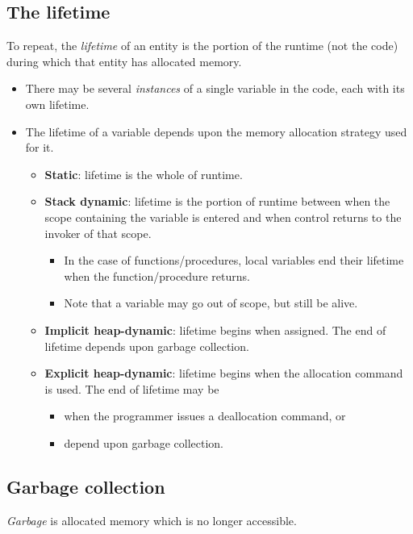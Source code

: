 \documentclass[11pt]{article}
\theoremstyle{definition}
\begin{document}
\subsection{The lifetime}
\label{sec:org3779266}
To repeat,
the \emph{lifetime} of an entity is the portion of the runtime
(not the code) during which that entity has allocated memory.
\begin{itemize}
\item There may be several \emph{instances} of a single variable in the code,
each with its own lifetime.
\item The lifetime of a variable depends upon the memory allocation
strategy used for it.
\begin{itemize}
\item \textbf{Static}: lifetime is the whole of runtime.
\item \textbf{Stack dynamic}: lifetime is the portion of runtime between
when the scope containing the variable is entered
and when control returns to the invoker of that scope.
\begin{itemize}
\item In the case of functions/procedures, local variables
end their lifetime when the function/procedure returns.
\item Note that a variable may go out of scope, but still be alive.
\end{itemize}
\item \textbf{Implicit heap-dynamic}: lifetime begins when assigned.
The end of lifetime depends upon garbage collection.
\item \textbf{Explicit heap-dynamic}: lifetime begins when the allocation
command is used. The end of lifetime may be
\begin{itemize}
\item when the programmer issues a deallocation command, or
\item depend upon garbage collection.
\end{itemize}
\end{itemize}
\end{itemize}

\subsection{Garbage collection}
\label{sec:org2a32e22}
\emph{Garbage} is allocated memory which is no longer accessible.
\end{document}
